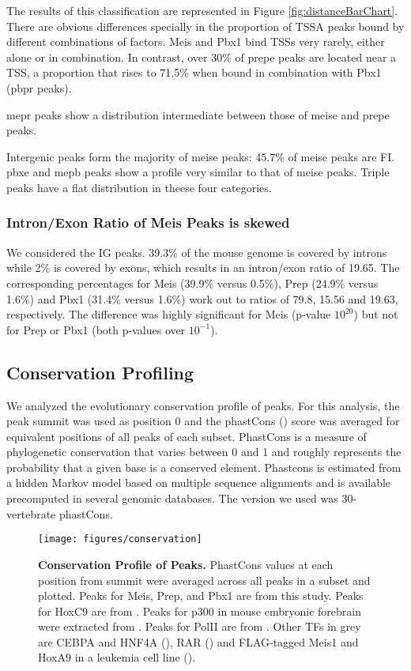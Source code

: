 The results of this classification are represented in Figure \ref{fig:distanceBarChart}. There are obvious differences specially in the proportion of \ac{TSSA} peaks bound by different combinations of factors. Meis and Pbx1 bind \acp{TSS} very rarely, either alone or in combination. In contrast, over 30\% of \ac{prepe} peaks are located near a \ac{TSS}, a proportion that rises to 71.5\% when bound in combination with Pbx1 (\ac{pbpr} peaks). 

\ac{mepr} peaks show a distribution intermediate between those of \ac{meise} and \ac{prepe} peaks.

Intergenic peaks form the majority of \ac{meise} peaks: 45.7\% of \ac{meise} peaks are \ac{FI}. \ac{pbxe} and \ac{mepb} peaks show a profile very similar to that of \ac{meise} peaks. Triple peaks have a flat distribution in theese four categories.

\subsubsection{Intron/Exon Ratio of Meis Peaks is skewed}

We considered the \ac{IG} peaks. 39.3\% of the mouse genome is covered by introns while 2\% is covered by exons, which results in an intron/exon ratio of 19.65. The corresponding percentages for Meis (39.9\% versus 0.5\%), Prep (24.9\% versus 1.6\%) and Pbx1 (31.4\% versus 1.6\%) work out to ratios of 79.8, 15.56 and 19.63, respectively. The difference was highly significant for Meis (p-value \< $10^20$) but not for Prep or Pbx1 (both p-values over $10^{-1}$). 

\subsection{Conservation Profiling}

We analyzed the evolutionary conservation profile of peaks. For this analysis, the peak summit was used as position 0 and the phastCons (\cite{Siepel2005}) score was averaged for equivalent positions of all peaks of each subset. PhastCons is a measure of phylogenetic conservation that varies between 0 and 1 and roughly represents the probability that a given base is a conserved element. Phastcons is estimated from a hidden Markov model based on multiple sequence alignments and is available precomputed in several genomic databases. The version we used was 30-vertebrate phastCons.

\begin{figure}[]
  \centering
  \texttt{[image: figures/conservation]}
  \caption[Conservation Profile of Peaks]{\textbf{Conservation Profile of Peaks.} PhastCons values at each position from summit were averaged across all peaks in a subset and plotted. Peaks for Meis, Prep, and Pbx1 are from this study. Peaks for HoxC9 are from \cite{Jung2010}. Peaks for p300 in mouse embryonic forebrain were extracted from \cite{Blow2010}. Peaks for PolII are from \cite{Mahony2011}. Other TFs in grey are CEBPA and HNF4A (\cite{Schmidt2010}), RAR (\cite{Mahony2011}) and FLAG-tagged Meis1 and HoxA9 in a leukemia cell line (\cite{Huang2012}).}
  \label{fig:conservation}
\end{figure}

